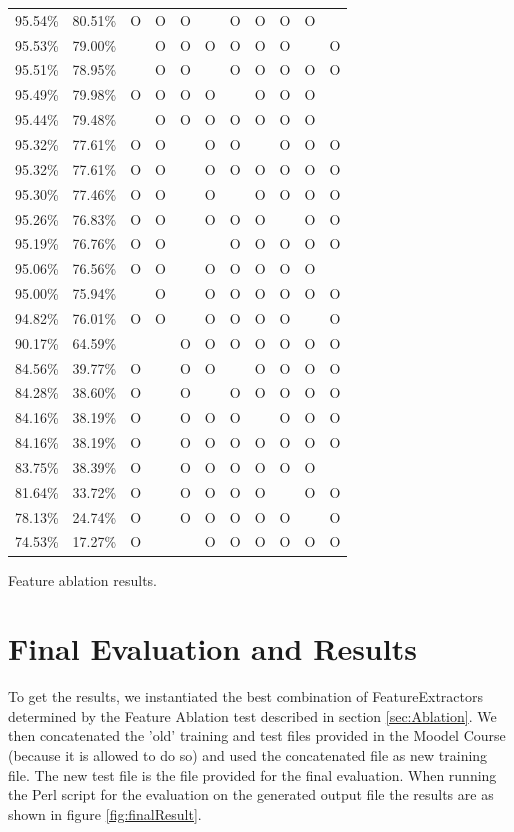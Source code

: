 \documentclass[11pt, english]{article}
\begin{document}
\begin{landscape}
\begin{tabular}{ll|ccccccccc}
    95.54\% & 80.51\% & O & O & O &  & O & O & O & O & \\
    95.53\% & 79.00\% &  & O & O & O & O & O & O &  & O\\
    95.51\% & 78.95\% &  & O & O &  & O & O & O & O & O\\
    95.49\% & 79.98\% & O & O & O & O &  & O & O & O & \\
    95.44\% & 79.48\% &  & O & O & O & O & O & O & O & \\
    95.32\% & 77.61\% & O & O &  & O & O &  & O & O & O\\
    95.32\% & 77.61\% & O & O &  & O & O & O & O & O & O\\
    95.30\% & 77.46\% & O & O &  & O &  & O & O & O & O\\
    95.26\% & 76.83\% & O & O &  & O & O & O &  & O & O\\
    95.19\% & 76.76\% & O & O &  &  & O & O & O & O & O\\
    95.06\% & 76.56\% & O & O &  & O & O & O & O & O & \\
    95.00\% & 75.94\% &  & O &  & O & O & O & O & O & O\\
    94.82\% & 76.01\% & O & O &  & O & O & O & O &  & O\\
    90.17\% & 64.59\% &  &  & O & O & O & O & O & O & O\\
    84.56\% & 39.77\% & O &  & O & O &  & O & O & O & O\\
    84.28\% & 38.60\% & O &  & O &  & O & O & O & O & O\\
    84.16\% & 38.19\% & O &  & O & O & O &  & O & O & O\\
    84.16\% & 38.19\% & O &  & O & O & O & O & O & O & O\\
    83.75\% & 38.39\% & O &  & O & O & O & O & O & O & \\
    81.64\% & 33.72\% & O &  & O & O & O & O &  & O & O\\
    78.13\% & 24.74\% & O &  & O & O & O & O & O &  & O\\
    74.53\% & 17.27\% & O &  &  & O & O & O & O & O & O\\
  \end{tabular}
  \caption{Feature ablation results.}
  \label{fig:results}
\end{landscape}


\section{Final Evaluation and Results}
To get the results, we instantiated the best combination of FeatureExtractors determined by the Feature Ablation test described in section \ref{sec:Ablation}. We then concatenated the 'old' training and test files provided in the Moodel Course (because it is allowed to do so) and used the concatenated file as new training file. The new test file is the file provided for the final evaluation. When running the Perl script for the evaluation on the generated output file the results are as shown in figure \ref{fig:finalResult}.
\end{document}
